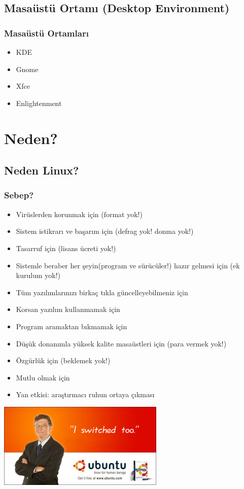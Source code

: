 \documentclass{beamer}
\begin{document}
	\subsection{Masaüstü Ortamı (Desktop Environment)}
		\begin{frame}
		 	\frametitle{Masaüstü Ortamları}
				\begin{itemize}
				 \item KDE
				 \item Gnome
				 \item Xfce
				 \item Enlightenment
				\end{itemize}

		\end{frame}


\section{Neden?}
	\subsection{Neden Linux?}
		\begin{frame}
		 	\frametitle{Sebep?}
			\begin{itemize}[<+->]
			 \item Virüslerden korunmak için (format yok!)
			 \item Sistem istikrarı ve başarım için (defrag yok! donma yok!)
			 \item Tasarruf için (lisans ücreti yok!)
			 \item Sistemle beraber her şeyin(program ve sürücüler!) hazır gelmesi için (ek kurulum yok!)
			 \item Tüm yazılımlarınızı birkaç tıkla güncelleyebilmeniz için
			 \item Korsan yazılım kullanmamak için
			 \item Program aramaktan bıkmamak için
			 \item Düşük donanımla yüksek kalite masaüstleri için (para vermek yok!)
			 \item Özgürlük için (beklemek yok!)
			 \item Mutlu olmak için
			 \item Yan etkisi: araştırmacı ruhun ortaya çıkması
			\end{itemize}

		\end{frame}
		\begin{frame}
		 \begin{center}
			 \includegraphics{bgl.png}
		\end{center}
		
		\end{frame}
\end{document}
